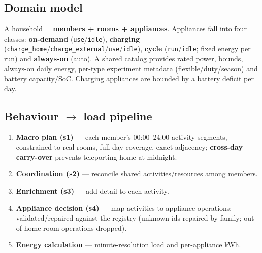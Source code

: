 \documentclass[11pt]{article}
\begin{document}
\subsection{Domain model}
A household = \textbf{members + rooms + appliances}. Appliances fall into four classes:
\textbf{on-demand} (\texttt{use}/\texttt{idle}), \textbf{charging}
(\texttt{charge\_home}/\texttt{charge\_external}/\texttt{use}/\texttt{idle}), \textbf{cycle}
(\texttt{run}/\texttt{idle}; fixed energy per run) and \textbf{always-on} (auto). A shared catalog
provides rated power, bounds, always-on daily energy, per-type experiment metadata (flexible/duty/season)
and battery capacity/SoC. Charging appliances are bounded by a battery deficit per day.

\subsection{Behaviour $\rightarrow$ load pipeline}
\begin{enumerate}
\item \textbf{Macro plan (s1)} --- each member's 00:00--24:00 activity segments, constrained to real
rooms, full-day coverage, exact adjacency; \textbf{cross-day carry-over} prevents teleporting home at
midnight.
\item \textbf{Coordination (s2)} --- reconcile shared activities/resources among members.
\item \textbf{Enrichment (s3)} --- add detail to each activity.
\item \textbf{Appliance decision (s4)} --- map activities to appliance operations; validated/repaired
against the registry (unknown ids repaired by family; out-of-home room operations dropped).
\item \textbf{Energy calculation} --- minute-resolution load and per-appliance kWh.
\end{enumerate}
\end{document}
